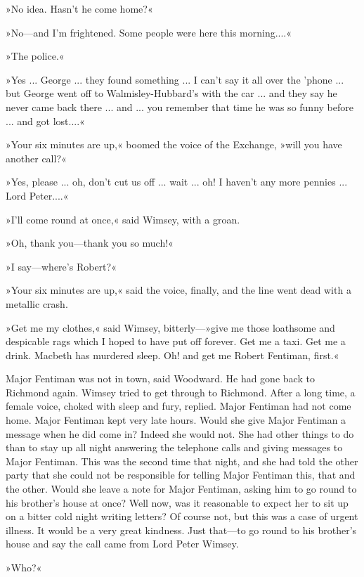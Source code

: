 »No idea. Hasn't he come home?«

»No\allowbreak---\allowbreak and I'm frightened. Some people were here this morning....«

»The police.«

»Yes ... George ... they found something ... I can't say it all over the 'phone ... but George went off to Walmisley-Hubbard's with the car ... and they say he never came back there ... and ... you remember that time he was so funny before ... and got lost....«

»Your six minutes are up,« boomed the voice of the Exchange, »will you have another call?«

»Yes, please ... oh, don't cut us off ... wait ... oh! I haven't any more pennies ... Lord Peter....«

»I'll come round at once,« said Wimsey, with a groan.

»Oh, thank you\allowbreak---\allowbreak thank you so much!«

»I say\allowbreak---\allowbreak where's Robert?«

»Your six minutes are up,« said the voice, finally, and the line went dead with a metallic crash.

»Get me my clothes,« said Wimsey, bitterly---»give me those loathsome and despicable rags which I hoped to have put off forever. Get me a taxi. Get me a drink. Macbeth has murdered sleep. Oh! and get me Robert Fentiman, first.«

Major Fentiman was not in town, said Woodward. He had gone back to Richmond again. Wimsey tried to get through to Richmond. After a long time, a female voice, choked with sleep and fury, replied. Major Fentiman had not come home. Major Fentiman kept very late hours. Would she give Major Fentiman a message when he did come in? Indeed she would not. She had other things to do than to stay up all night answering the telephone calls and giving messages to Major Fentiman. This was the second time that night, and she had told the other party that she could not be responsible for telling Major Fentiman this, that and the other. Would she leave a note for Major Fentiman, asking him to go round to his brother's house at once? Well now, was it reasonable to expect her to sit up on a bitter cold night writing letters? Of course not, but this was a case of urgent illness. It would be a very great kindness. Just that\allowbreak---\allowbreak to go round to his brother's house and say the call came from Lord Peter Wimsey.

»Who?«

